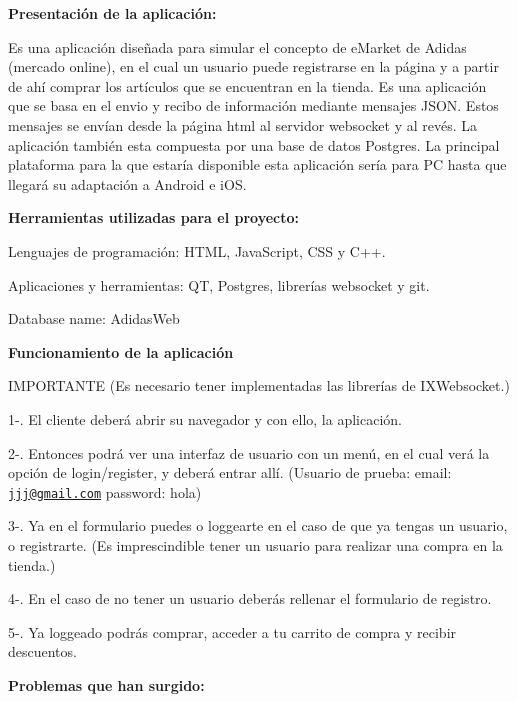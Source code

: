 



{\bfseries Presentación de la aplicación\+:}

Es una aplicación diseñada para simular el concepto de e\+Market de Adidas (mercado online), en el cual un usuario puede registrarse en la página y a partir de ahí comprar los artículos que se encuentran en la tienda. Es una aplicación que se basa en el envio y recibo de información mediante mensajes J\+S\+ON. Estos mensajes se envían desde la página html al servidor websocket y al revés. La aplicación también esta compuesta por una base de datos Postgres. La principal plataforma para la que estaría disponible esta aplicación sería para PC hasta que llegará su adaptación a Android e i\+OS.

{\bfseries Herramientas utilizadas para el proyecto\+:}


\begin{DoxyItemize}
\item Lenguajes de programación\+: H\+T\+ML, Java\+Script, C\+SS y C++.
\item Aplicaciones y herramientas\+: QT, Postgres, librerías websocket y git.
\item Database name\+: Adidas\+Web
\end{DoxyItemize}

{\bfseries Funcionamiento de la aplicación}

I\+M\+P\+O\+R\+T\+A\+N\+TE (Es necesario tener implementadas las librerías de I\+X\+Websocket.)

1-\/. El cliente deberá abrir su navegador y con ello, la aplicación.

2-\/. Entonces podrá ver una interfaz de usuario con un menú, en el cual verá la opción de login/register, y deberá entrar allí. (Usuario de prueba\+: email\+: \href{mailto:jjj@gmail.com}{\tt jjj@gmail.\+com} password\+: hola)

3-\/. Ya en el formulario puedes o loggearte en el caso de que ya tengas un usuario, o registrarte. (Es imprescindible tener un usuario para realizar una compra en la tienda.)

4-\/. En el caso de no tener un usuario deberás rellenar el formulario de registro.

5-\/. Ya loggeado podrás comprar, acceder a tu carrito de compra y recibir descuentos.





{\bfseries Problemas que han surgido\+:}


